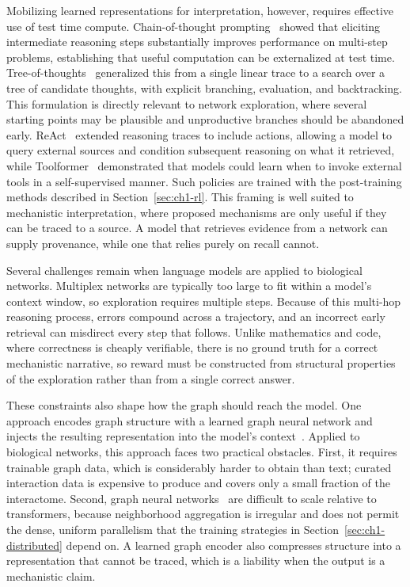 Mobilizing learned representations for interpretation, however, requires effective use of test time compute. Chain-of-thought prompting~\cite{wei2022chain} showed that eliciting intermediate reasoning steps substantially improves performance on multi-step problems, establishing that useful computation can be externalized at test time. Tree-of-thoughts~\cite{yao2023tree} generalized this from a single linear trace to a search over a tree of candidate thoughts, with explicit branching, evaluation, and backtracking. This formulation is directly relevant to network exploration, where several starting points may be plausible and unproductive branches should be abandoned early. ReAct~\cite{yao2022react} extended reasoning traces to include actions, allowing a model to query external sources and condition subsequent reasoning on what it retrieved, while Toolformer~\cite{schick2023toolformer} demonstrated that models could learn when to invoke external tools in a self-supervised manner. Such policies are trained with the post-training methods described in Section~\ref{sec:ch1-rl}. This framing is well suited to mechanistic interpretation, where proposed mechanisms are only useful if they can be traced to a source. A model that retrieves evidence from a network can supply provenance, while one that relies purely on recall cannot.

Several challenges remain when language models are applied to biological networks. Multiplex networks are typically too large to fit within a model's context window, so exploration requires multiple steps. Because of this multi-hop reasoning process, errors compound across a trajectory, and an incorrect early retrieval can misdirect every step that follows. Unlike mathematics and code, where correctness is cheaply verifiable, there is no ground truth for a correct mechanistic narrative, so reward must be constructed from structural properties of the exploration rather than from a single correct answer.

These constraints also shape how the graph should reach the model. One approach encodes graph structure with a learned graph neural network and injects the resulting representation into the model's context~\cite{g-retriever}. Applied to biological networks, this approach faces two practical obstacles. First, it requires trainable graph data, which is considerably harder to obtain than text; curated interaction data is expensive to produce and covers only a small fraction of the interactome. Second, graph neural networks~\cite{kipf2016semi, velivckovic2017graph} are difficult to scale relative to transformers, because neighborhood aggregation is irregular and does not permit the dense, uniform parallelism that the training strategies in Section~\ref{sec:ch1-distributed} depend on. A learned graph encoder also compresses structure into a representation that cannot be traced, which is a liability when the output is a mechanistic claim.

